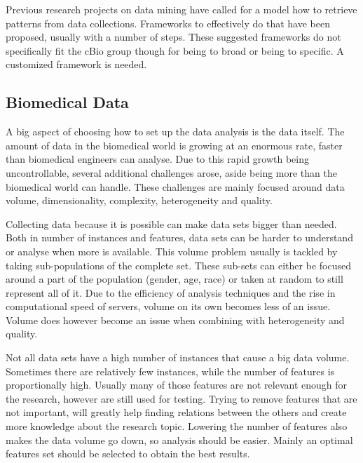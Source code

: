 \documentclass[10pt,a4paper]{article}
\begin{document}
	Previous research projects on data mining have called for a model how to retrieve patterns from data collections. Frameworks to effectively do that have been proposed, usually with a number of steps.\cite{CIOS20021} These suggested frameworks do not specifically fit the cBio group though for being to broad \cite{fayyad1996knowledge} or being to specific. \cite{cios2000knowledge} A customized framework is needed. 
	
	\subsection{Biomedical Data}
	\label{subsec:BiomedicalData}
	
	A big aspect of choosing how to set up the data analysis is the data itself. The amount of data in the biomedical world is growing at an enormous rate, faster than biomedical engineers can analyse. Due to this rapid growth being uncontrollable, several additional challenges arose, aside being more than the biomedical world can handle. These challenges are mainly focused around data volume, dimensionality, complexity, heterogeneity and quality.\cite{chen2006medical}
	
	Collecting data because it is possible can make data sets bigger than needed. Both in number of instances and features, data sets can be harder to understand or analyse when more is available.\cite{chen2006medical} This volume problem usually is tackled by taking sub-populations of the complete set. These sub-sets can either be focused around a part of the population (gender, age, race) or taken at random to still represent all of it. Due to the efficiency of analysis techniques and the rise in computational speed of servers\cite{blythe2008rise}, volume on its own becomes less of an issue. Volume does however become an issue when combining with heterogeneity and quality. \cite{Turkay2014, Holzinger2014} 
	
	Not all data sets have a high number of instances that cause a big data volume. Sometimes there are relatively few instances, while the number of features is proportionally high. Usually many of those features are not relevant enough for the research, however are still used for testing. Trying to remove features that are not important, will greatly help finding relations between the others and create more knowledge about the research topic. Lowering the number of features also makes the data volume go down, so analysis should be easier. Mainly an optimal features set should be selected to obtain the best results. \cite{PENG201015}
	
\end{document}

